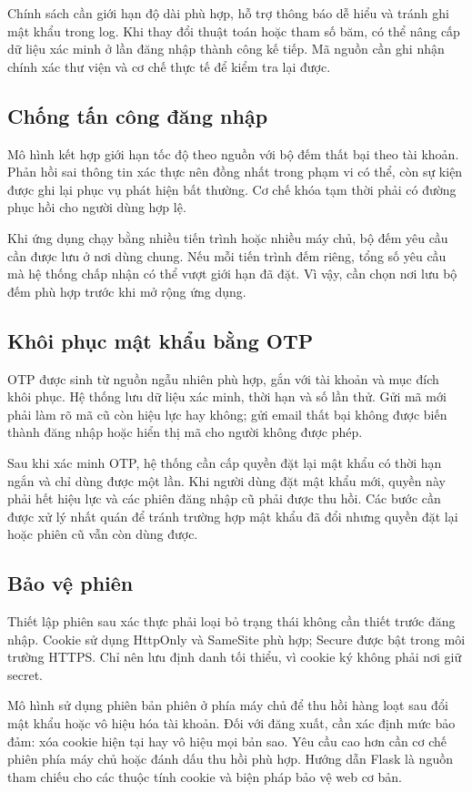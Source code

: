 Chính sách cần giới hạn độ dài phù hợp, hỗ trợ thông báo dễ hiểu và tránh ghi mật khẩu trong log. Khi thay đổi thuật toán hoặc tham số băm, có thể nâng cấp dữ liệu xác minh ở lần đăng nhập thành công kế tiếp. Mã nguồn cần ghi nhận chính xác thư viện và cơ chế thực tế để kiểm tra lại được.
\subsection{Chống tấn công đăng nhập}
Mô hình kết hợp giới hạn tốc độ theo nguồn với bộ đếm thất bại theo tài khoản. Phản hồi sai thông tin xác thực nên đồng nhất trong phạm vi có thể, còn sự kiện được ghi lại phục vụ phát hiện bất thường. Cơ chế khóa tạm thời phải có đường phục hồi cho người dùng hợp lệ.

Khi ứng dụng chạy bằng nhiều tiến trình hoặc nhiều máy chủ, bộ đếm yêu cầu cần được lưu ở nơi dùng chung. Nếu mỗi tiến trình đếm riêng, tổng số yêu cầu mà hệ thống chấp nhận có thể vượt giới hạn đã đặt. Vì vậy, cần chọn nơi lưu bộ đếm phù hợp trước khi mở rộng ứng dụng.
\subsection{Khôi phục mật khẩu bằng OTP}
OTP được sinh từ nguồn ngẫu nhiên phù hợp, gắn với tài khoản và mục đích khôi phục. Hệ thống lưu dữ liệu xác minh, thời hạn và số lần thử. Gửi mã mới phải làm rõ mã cũ còn hiệu lực hay không; gửi email thất bại không được biến thành đăng nhập hoặc hiển thị mã cho người không được phép.

Sau khi xác minh OTP, hệ thống cần cấp quyền đặt lại mật khẩu có thời hạn ngắn và chỉ dùng được một lần. Khi người dùng đặt mật khẩu mới, quyền này phải hết hiệu lực và các phiên đăng nhập cũ phải được thu hồi. Các bước cần được xử lý nhất quán để tránh trường hợp mật khẩu đã đổi nhưng quyền đặt lại hoặc phiên cũ vẫn còn dùng được.
\subsection{Bảo vệ phiên}
Thiết lập phiên sau xác thực phải loại bỏ trạng thái không cần thiết trước đăng nhập. Cookie sử dụng HttpOnly và SameSite phù hợp; Secure được bật trong môi trường HTTPS. Chỉ nên lưu định danh tối thiểu, vì cookie ký không phải nơi giữ secret.

Mô hình sử dụng phiên bản phiên ở phía máy chủ để thu hồi hàng loạt sau đổi mật khẩu hoặc vô hiệu hóa tài khoản. Đối với đăng xuất, cần xác định mức bảo đảm: xóa cookie hiện tại hay vô hiệu mọi bản sao. Yêu cầu cao hơn cần cơ chế phiên phía máy chủ hoặc đánh dấu thu hồi phù hợp. Hướng dẫn Flask là nguồn tham chiếu cho các thuộc tính cookie và biện pháp bảo vệ web cơ bản.\cite{flask}

